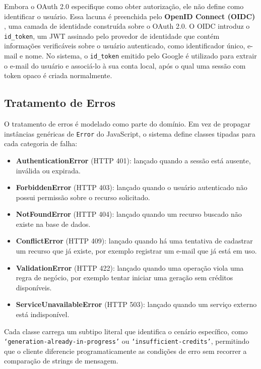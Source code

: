\documentclass[article,a4paper,12pt,brazil,sumario=tradicional]{abntex2}
\begin{document}
Embora o OAuth 2.0 especifique como obter autorização, ele não define como identificar o usuário. Essa lacuna é preenchida pelo \textbf{OpenID Connect (OIDC)} \cite{openidconnect}, uma camada de identidade construída sobre o OAuth 2.0. O OIDC introduz o \texttt{id\_token}, um JWT assinado pelo provedor de identidade que contém informações verificáveis sobre o usuário autenticado, como identificador único, e-mail e nome. No sistema, o \texttt{id\_token} emitido pelo Google é utilizado para extrair o e-mail do usuário e associá-lo à sua conta local, após o qual uma sessão com token opaco é criada normalmente.

\subsection{Tratamento de Erros}

O tratamento de erros é modelado como parte do domínio. Em vez de propagar instâncias genéricas de \texttt{Error} do JavaScript, o sistema define classes tipadas para cada categoria de falha:

\begin{itemize}
    \item \textbf{AuthenticationError} (HTTP 401): lançado quando a sessão está ausente, inválida ou expirada.
    \item \textbf{ForbiddenError} (HTTP 403): lançado quando o usuário autenticado não possui permissão sobre o recurso solicitado.
    \item \textbf{NotFoundError} (HTTP 404): lançado quando um recurso buscado não existe na base de dados.
    \item \textbf{ConflictError} (HTTP 409): lançado quando há uma tentativa de cadastrar um recurso que já existe, por exemplo registrar um e-mail que já está em uso.
    \item \textbf{ValidationError} (HTTP 422): lançado quando uma operação viola uma regra de negócio, por exemplo tentar iniciar uma geração sem créditos disponíveis.
    \item \textbf{ServiceUnavailableError} (HTTP 503): lançado quando um serviço externo está indisponível.
\end{itemize}

Cada classe carrega um subtipo literal que identifica o cenário específico, como \texttt{`generation-already-in-progress'} ou \texttt{`insufficient-credits'}, permitindo que o cliente diferencie programaticamente as condições de erro sem recorrer a comparação de strings de mensagem.
\end{document}
